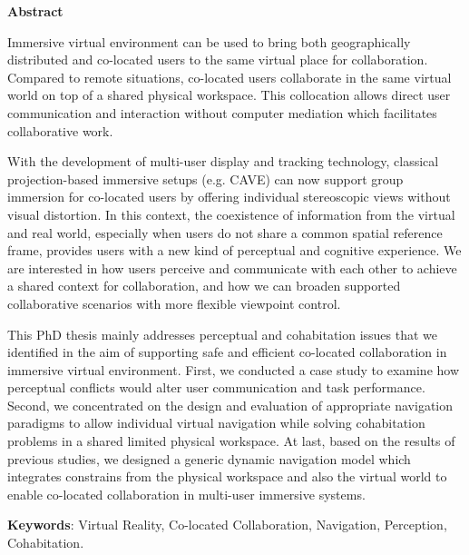 \centerline{\LARGE \textbf{Abstract}}

\vspace*{\baselineskip}
Immersive virtual environment can be used to bring both geographically distributed and co-located users to the same virtual place for collaboration. Compared to remote situations, co-located users collaborate in the same virtual world on top of a shared physical workspace. This collocation allows direct user communication and interaction without computer mediation which facilitates collaborative work.

With the development of multi-user display and tracking technology, classical projection-based immersive setups (e.g. CAVE) can now support group immersion for co-located users by offering individual stereoscopic views without visual distortion. In this context, the coexistence of information from the virtual and real world, especially when users do not share a common spatial reference frame, provides users with a new kind of perceptual and cognitive experience. We are interested in how users perceive and communicate with each other to achieve a shared context for collaboration, and how we can broaden supported collaborative scenarios with more flexible viewpoint control.

This PhD thesis mainly addresses perceptual and cohabitation issues that we identified in the aim of supporting safe and efficient co-located collaboration in immersive virtual environment. First, we conducted a case study to examine how perceptual conflicts would alter user communication and task performance. Second, we concentrated on the design and evaluation of appropriate navigation paradigms to allow individual virtual navigation while solving cohabitation problems in a shared limited physical workspace. At last, based on the results of previous studies, we designed a generic dynamic navigation model which integrates constrains from the physical workspace and also the virtual world to enable co-located collaboration in multi-user immersive systems.


\textbf{Keywords}: Virtual Reality, Co-located Collaboration, Navigation, Perception, Cohabitation.

\pagebreak